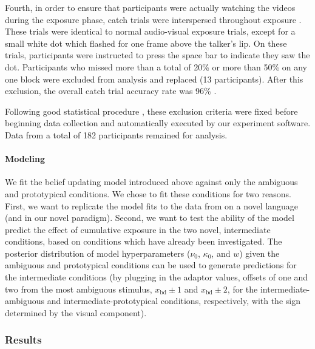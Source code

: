 Fourth, in order to ensure that participants were actually watching the videos during the exposure phase, catch trials were interspersed throughout exposure \autocite[as in][]{Vroomen2007}.  These trials were identical to normal audio-visual exposure trials, except for a small white dot which flashed for one frame above the talker's lip.  On these trials, participants were instructed to press the space bar to indicate they saw the dot.  Participants who missed more than a total of 20\% or more than 50\% on any one block were excluded from analysis and replaced (13 participants).  After this exclusion, the overall catch trial accuracy rate was 96\% \autocite[compared to 93\% reported by][]{Vroomen2007}.

Following good statistical procedure \autocite{Simmons2011}, these exclusion criteria were fixed before beginning data collection and automatically executed by our experiment software.
Data from a total of 182 participants remained for analysis.

\paragraph{Modeling}
\label{sec:modeling-intr-analysis}

We fit the belief updating model introduced above against only the ambiguous and prototypical conditions.  We chose to fit these conditions for two reasons.  First, we want to replicate the model fits to the data from \textcite{Vroomen2007} on a novel language (and in our novel paradigm).  Second, we want to test the ability of the model predict the effect of cumulative exposure in the two novel, intermediate conditions, based on conditions which have already been investigated.  The posterior distribution of model hyperparameters ($\nu_0$, $\kappa_0$, and $w$) given the ambiguous and prototypical conditions can be used to generate predictions for the intermediate conditions (by plugging in the adaptor values, offsets of one and two from the most ambiguous stimulus, $x_\mathrm{bd} \pm 1$ and $x_\mathrm{bd} \pm 2$, for the intermediate-ambiguous and intermediate-prototypical conditions, respectively, with the sign determined by the visual component).

\subsubsection{Results}
\label{sec:results-4}

